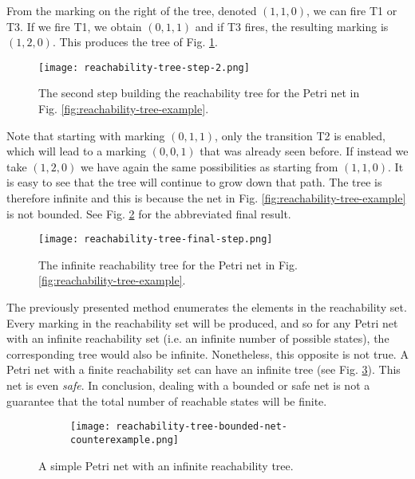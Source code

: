 From the marking on the right of the tree, denoted $(1, 1, 0)$, we can fire T1 or T3.
If we fire T1, we obtain $(0, 1, 1)$ and if T3 fires, the resulting marking is $(1, 2, 0)$.
This produces the tree of Fig. \ref{fig:reachability-tree-step-2}.

\begin{figure}
    \centering
    \texttt{[image: reachability-tree-step-2.png]}
    \caption{The second step building the reachability tree
        for the Petri net in Fig. \ref{fig:reachability-tree-example}.}
    \label{fig:reachability-tree-step-2}
\end{figure}

Note that starting with marking $(0, 1, 1)$, only the transition T2 is enabled,
which will lead to a marking $(0, 0, 1)$ that was already seen before.
If instead we take $(1, 2, 0)$ we have again the same possibilities as starting from $(1, 1, 0)$.
It is easy to see that the tree will continue to grow down that path.
The tree is therefore infinite and this is because
the net in Fig. \ref{fig:reachability-tree-example} is not bounded.
See Fig. \ref{fig:reachability-tree-final-step} for the abbreviated final result.

\begin{figure}[!htb]
    \centering
    \texttt{[image: reachability-tree-final-step.png]}
    \caption{The infinite reachability tree for the Petri net in Fig. \ref{fig:reachability-tree-example}.}
    \label{fig:reachability-tree-final-step}
\end{figure}

The previously presented method enumerates the elements in the reachability set.
Every marking in the reachability set will be produced,
and so for any Petri net with an infinite reachability set (i.e. an infinite number of possible states),
the corresponding tree would also be infinite.
Nonetheless, this opposite is not true.
A Petri net with a finite reachability set can have an infinite tree
(see Fig. \ref{fig:reachability-tree-bounded-net-counterexample}).
This net is even \emph{safe}.
In conclusion, dealing with a bounded or safe net is not
a guarantee that the total number of reachable states will be finite.

\begin{figure}
    \centering
    \begin{subfigure}
        \centering
    \end{subfigure}
    \hspace{1.5cm}
    \begin{subfigure}
        \centering
        \texttt{[image: reachability-tree-bounded-net-counterexample.png]}
    \end{subfigure}
    \caption{A simple Petri net with an infinite reachability tree.}
    \label{fig:reachability-tree-bounded-net-counterexample}
\end{figure}


